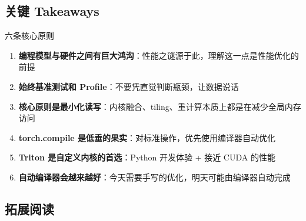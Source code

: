 \subsection{关键 Takeaways}

\begin{importantbox}{六条核心原则}
\begin{enumerate}
    \item \textbf{编程模型与硬件之间有巨大鸿沟}：性能之谜源于此，理解这一点是性能优化的前提
    \item \textbf{始终基准测试和 Profile}：不要凭直觉判断瓶颈，让数据说话
    \item \textbf{核心原则是最小化读写}：内核融合、tiling、重计算本质上都是在减少全局内存访问
    \item \textbf{torch.compile 是低垂的果实}：对标准操作，优先使用编译器自动优化
    \item \textbf{Triton 是自定义内核的首选}：Python 开发体验 + 接近 CUDA 的性能
    \item \textbf{自动编译器会越来越好}：今天需要手写的优化，明天可能由编译器自动完成
\end{enumerate}
\end{importantbox}

\subsection{拓展阅读}

